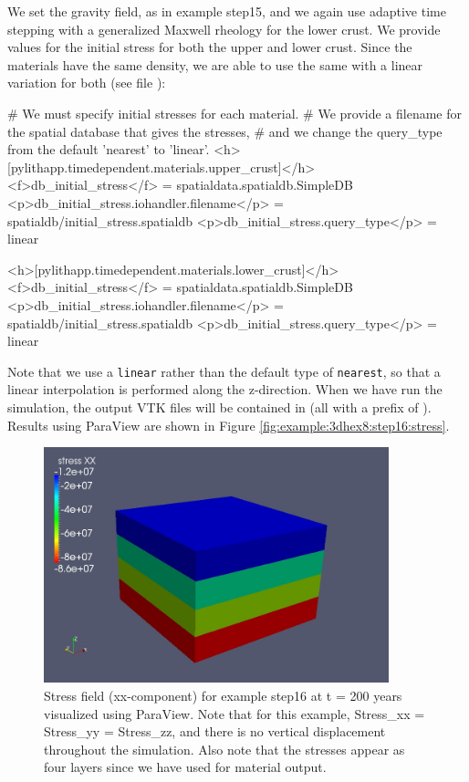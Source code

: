 We set the gravity field, as in example step15, and we again use adaptive
time stepping with a generalized Maxwell rheology for the lower crust.
We provide values for the initial stress for both the upper and lower
crust. Since the materials have the same density, we are able to use
the same  with a linear variation for both (see file
):
\begin{cfg}
# We must specify initial stresses for each material.
# We provide a filename for the spatial database that gives the stresses,
# and we change the query_type from the default 'nearest' to 'linear'.
<h>[pylithapp.timedependent.materials.upper_crust]</h>
<f>db_initial_stress</f> = spatialdata.spatialdb.SimpleDB
<p>db_initial_stress.iohandler.filename</p> = spatialdb/initial_stress.spatialdb
<p>db_initial_stress.query_type</p> = linear

<h>[pylithapp.timedependent.materials.lower_crust]</h>
<f>db_initial_stress</f> = spatialdata.spatialdb.SimpleDB
<p>db_initial_stress.iohandler.filename</p> = spatialdb/initial_stress.spatialdb
<p>db_initial_stress.query_type</p> = linear
\end{cfg}
Note that we use a \texttt{linear}  rather than
the default type of \texttt{nearest}, so that a linear interpolation
is performed along the z-direction. When we have run the simulation,
the output VTK files will be contained in 
(all with a prefix of ). Results using ParaView are
shown in Figure \vref{fig:example:3dhex8:step16:stress}.

\begin{figure}
  \includegraphics[width=10cm]{examples/figs/3dhex8_step16-stress_xx-t200}
  \caption{Stress field (xx-component) for example step16 at t = 200 years visualized
    using ParaView. Note that for this example, Stress\_xx = Stress\_yy
    = Stress\_zz, and there is no vertical displacement throughout the
    simulation. Also note that the stresses appear as four layers since
    we have used  for material output.}
  \label{fig:example:3dhex8:step16:stress}
\end{figure}


